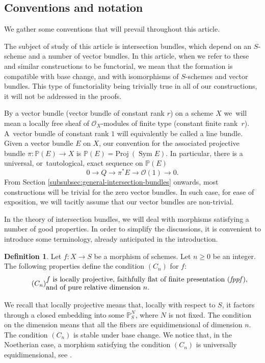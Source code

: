 \documentclass[JEP,XML,SOM,Unicode,published]{cedram}
\theoremstyle{plain}
\theoremstyle{definition}
\newtheorem{definition}[theorem]{Definition}
\newcommand{\PBbb}{\mathbb P}
\newcommand{\Ocal}{\mathcal O}
\newcommand{\fppf}{\emph{fppf}\xspace}
\DeclareMathOperator{\Sym}{Sym}
\begin{document}
\subsection{Conventions and notation}\label{subsec:conventions-notations}
We gather some conventions that will prevail throughout this article.

The subject of study of this article is intersection bundles, which depend on an $S$-scheme and a number of vector bundles. In this article, when we refer to these and similar constructions to be functorial, we mean that the formation is compatible with base change, and with isomorphisms of $S$-schemes and vector bundles. This type of functoriality being trivially true in all of our constructions, it will not be addressed in the proofs.

By a vector bundle (\resp vector bundle of constant rank $r$) on a scheme $X$ we~will mean a locally free sheaf of $\Ocal_{X}$-modules of finite type (\resp constant finite rank~$r$). A~vector bundle of constant rank $1$ will equivalently be called a line bundle. Given a vector bundle $E$ on $X$, our convention for the associated projective bundle \hbox{$\pi\colon\PBbb(E)\to X$} is $\PBbb(E)=\mathrm{Proj}\ (\Sym E)$. In particular, there is a universal, or~tautological, exact sequence on $\PBbb(E)$\vspace*{-3pt}\enlargethispage{\baselineskip}
\begin{equation}\label{eq:tautological-exact-sequence}
0 \to Q \to \pi^\ast E \to \Ocal(1) \to 0.
\end{equation}
From Section \ref{subsubsec:general-intersection-bundles} onwards, most constructions will be trivial for the zero vector bundles. In such case, for ease of exposition, we will tacitly assume that our vector bundles are non-trivial.

In the theory of intersection bundles, we will deal with morphisms satisfying a number of good properties. In order to simplify the discussions, it is convenient to introduce some terminology, already anticipated in the introduction.

\begin{definition}
Let $f \colon X \to S$ be a morphism of schemes. Let $n\geq 0 $ be an integer. The following properties define the condition $(C_n)$ for $f$:
\begin{equation}\tag{$C_n$}\label{condition-Cn}
\begin{split}
&f \text{ is locally projective, faithfully flat of finite presentation (\fppf),}
\\[-3.5pt]
& \text{and of pure relative dimension }n.
\end{split}
\end{equation}
\end{definition}
We recall that locally projective means that, locally with respect to $S$, it factors through a closed embedding into some $\PBbb^N_S$, where $N$ is not fixed. The condition on the dimension means that all the fibers are equidimensional of dimension $n$. The condition $(C_{n})$ is stable under base change. We notice that, in the Noetherian case, a morphism satisfying the condition $(C_{n})$ is universally equidimensional, see \cite[Def.\,2.1.2 \& Prop.\,2.1.7 (2)]{Suslin-Voevodsky}.
\end{document}
